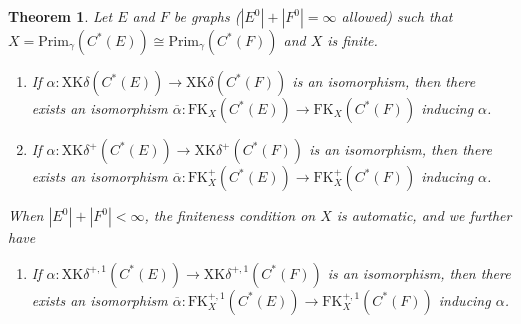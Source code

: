 \documentclass[12pt]{amsbook}%
\newtheorem{theor}{Theorem}[section]
\theoremstyle{defin}
\theoremstyle{remark}
\numberwithin{equation}{chapter}
\numberwithin{theor}{section}
\begin{document}
\begin{theor}\label{thm:XKdelta-filteredkthy}
Let $E$ and $F$ be graphs ($|E^0|+|F^0|=\infty$ allowed) such that $X =  \mathrm{Prim}_\gamma ( C^*(E)) \cong \mathrm{Prim}_\gamma ( C^*(F))$ and $X$ is finite.
\begin{enumerate}[(1)]
\item If $\alpha \colon \mathrm{XK}\delta ( C^*(E) ) \to \mathrm{XK}\delta (C^*(F))$ is an isomorphism, then there exists an isomorphism $\overline{\alpha} \colon \mathrm{FK}_X ( C^*(E)) \to \mathrm{FK}_X ( C^*(F))$ inducing $\alpha$.

\item If  $\alpha \colon \mathrm{XK}\delta^+ ( C^*(E) ) \to \mathrm{XK}\delta^+ (C^*(F))$ is an isomorphism, then there exists an isomorphism $\overline{\alpha} \colon \mathrm{FK}^+_X(C^*(E)) \to \mathrm{FK}^+_X(C^*(F))$ inducing $\alpha$.
\end{enumerate}
When  $|E^0|+|F^0|<\infty$, the finiteness condition on $X$ is automatic, and we further have 
\begin{enumerate}[(1)]\addtocounter{enumi}{2}
\item   If  $\alpha \colon \mathrm{XK}\delta^{+,1} ( C^*(E) ) \to \mathrm{XK}\delta^{+,1} (C^*(F))$ is an isomorphism, then there exists an isomorphism $\overline{\alpha} \colon \mathrm{FK}^{+,1}_X (C^*(E)) \to \mathrm{FK}^{+,1}_X (C^*(F))$ inducing $\alpha$.
\end{enumerate}
\end{theor}
\end{document}
